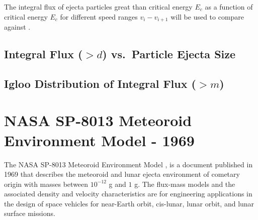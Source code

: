 \documentclass{hitec}
\numberwithin{equation}{section}
\begin{document}
The integral flux of ejecta particles great than critical energy $E_c$ as a function of critical energy $E_c$ for different speed ranges $v_{i}-v_{i+1}$ will be used to compare against \cite{bjorkman2019astronaut}.


\subsection{Integral Flux ($>d$) vs.\ Particle Ejecta Size}\label{ssec:IntFlux_d_d}


\subsection{Igloo Distribution of Integral Flux ($>m$)}\label{ssec:IglooIntFlux_m}





\section{NASA SP-8013 Meteoroid Environment Model - 1969}\label{sec:NASA SP-8013 Meteoroid Environment Model}

The NASA SP-8013 Meteoroid Environment Model \citep{cour1969meteoroid}, is a document published in 1969 that describes the meteoroid and lunar ejecta environment of cometary origin with masses between $10^{-12}$ g and $1$ g. The flux-mass models and the associated density and velocity characteristics are for engineering applications in the design of space vehicles for near-Earth orbit, cis-lunar, lunar orbit, and lunar surface missions.
\end{document}
